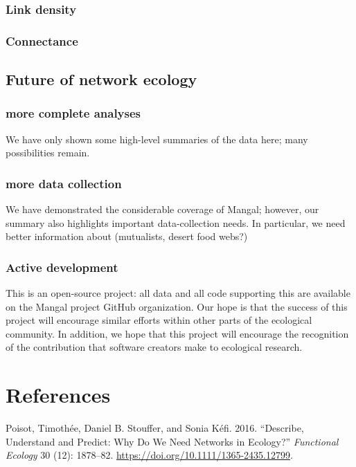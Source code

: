 \hypertarget{link-density}{%
\subsubsection{Link density}\label{link-density}}

\hypertarget{connectance}{%
\subsubsection{Connectance}\label{connectance}}

\hypertarget{future-of-network-ecology}{%
\subsection{Future of network ecology}\label{future-of-network-ecology}}

\hypertarget{more-complete-analyses}{%
\subsubsection{more complete analyses}\label{more-complete-analyses}}

We have only shown some high-level summaries of the data here; many
possibilities remain.

\hypertarget{more-data-collection}{%
\subsubsection{more data collection}\label{more-data-collection}}

We have demonstrated the considerable coverage of Mangal; however, our
summary also highlights important data-collection needs. In particular,
we need better information about (mutualists, desert food webs?)

\hypertarget{active-development}{%
\subsubsection{Active development}\label{active-development}}

This is an open-source project: all data and all code supporting this
are available on the Mangal project GitHub organization. Our hope is
that the success of this project will encourage similar efforts within
other parts of the ecological community. In addition, we hope that this
project will encourage the recognition of the contribution that software
creators make to ecological research.

\hypertarget{references}{%
\section*{References}\label{references}}

\hypertarget{refs}{}
\leavevmode\hypertarget{ref-PoisStou16}{}%
Poisot, Timothée, Daniel B. Stouffer, and Sonia Kéfi. 2016. ``Describe,
Understand and Predict: Why Do We Need Networks in Ecology?''
\emph{Functional Ecology} 30 (12): 1878--82.
\url{https://doi.org/10.1111/1365-2435.12799}.
